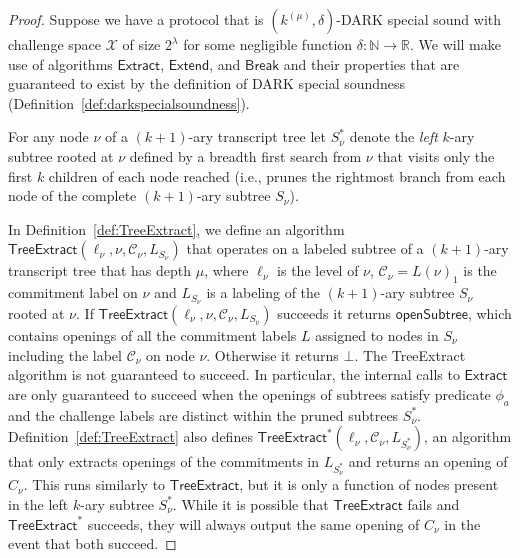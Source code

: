 \begin{proof} 
Suppose we have a protocol that is $(k^{(\mu)}, \delta)$-DARK special sound with challenge space $\mathcal{X}$ of size $2^\lambda$ for some negligible function $\delta: \mathbb{N} \rightarrow \mathbb{R}$. We will make use of algorithms $\textsf{Extract}$, $\textsf{Extend}$, and $\textsf{Break}$ and their properties that are guaranteed to exist by the definition of DARK special soundness (Definition~\ref{def:darkspecialsoundness}). 

For any node $\nu$ of a $(k+1)$-ary transcript tree let $S^*_\nu$ denote the \emph{left} $k$-ary subtree rooted at $\nu$ defined by a breadth first search from $\nu$ that visits only the first $k$ children of each node reached (i.e., prunes the rightmost branch from each node of the complete $(k+1)$-ary subtree $S_\nu$).

In Definition~\ref{def:TreeExtract}, we define an algorithm $\textsf{TreeExtract}(\ell_\nu, \nu, \mathcal{C}_\nu, L_{S_\nu})$ that operates on a labeled subtree of a $(k+1)$-ary transcript tree that has depth $\mu$,  where $\ell_\nu$ is the level of $\nu$, $\mathcal{C}_\nu = L(\nu)_1$ is the commitment label on $\nu$ and $L_{S_\nu}$ is a labeling of the $(k+1)$-ary subtree $S_\nu$ rooted at $\nu$. If $\textsf{TreeExtract}(\ell_\nu, \nu, \mathcal{C}_\nu, L_{S_\nu})$ succeeds it returns $\textsf{openSubtree}$, which contains openings of all the commitment labels $L$ assigned to nodes in $S_\nu$ including the label $\mathcal{C}_\nu$ on node $\nu$. Otherwise it returns $\bot$. The \textsf{TreeExtract} algorithm is not guaranteed to succeed. In particular, the internal calls to $\textsf{Extract}$ are only guaranteed to succeed when the openings of subtrees satisfy predicate $\phi_a$ and the challenge labels are distinct within the pruned subtrees $S^*_\nu$. Definition~\ref{def:TreeExtract} also defines $\textsf{TreeExtract}^*(\ell_\nu, \mathcal{C}_\nu, L_{S^*_\nu})$, an algorithm that only extracts openings of the commitments in $L_{S^*_\nu}$ and returns an opening of $C_\nu$. This runs similarly to $\textsf{TreeExtract}$, but it is only a function of nodes present in the left $k$-ary subtree $S^*_\nu$. While it is possible that $\textsf{TreeExtract}$ fails and $\textsf{TreeExtract}^*$ succeeds, they will always output the same opening of $C_\nu$ in the event that both succeed.


\end{proof}
